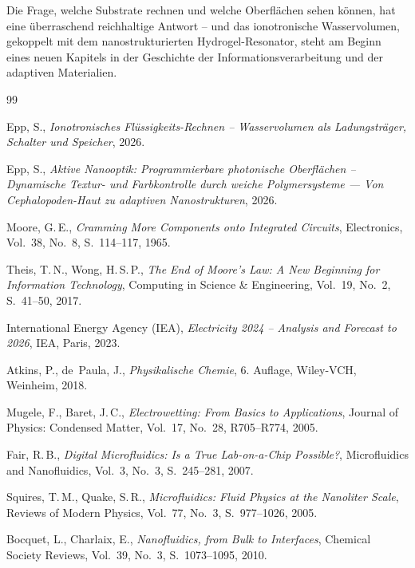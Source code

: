 ﻿\documentclass[a4paper,12pt]{scrreprt}
\theoremstyle{definition}
\begin{document}
Die Frage, welche Substrate rechnen und welche Oberflächen sehen können,
hat eine überraschend reichhaltige Antwort -- und das ionotronische
Wasservolumen, gekoppelt mit dem nanostrukturierten Hydrogel-Resonator,
steht am Beginn eines neuen Kapitels in der Geschichte der Informationsverarbeitung
und der adaptiven Materialien.

\begin{thebibliography}{99}

  Epp, S.,
  \textit{Ionotronisches Flüssigkeits-Rechnen -- Wasservolumen als Ladungsträger, Schalter und Speicher},
  2026.
  
  Epp, S.,
  \textit{Aktive Nanooptik: Programmierbare photonische Oberflächen -- Dynamische Textur- und Farbkontrolle durch weiche Polymersysteme --- Von Cephalopoden-Haut zu adaptiven Nanostrukturen},
  2026.
  
  Moore, G.\,E.,
  \textit{Cramming More Components onto Integrated Circuits},
  Electronics, Vol.~38, No.~8, S.~114--117, 1965.

  Theis, T.\,N., Wong, H.\,S.\,P.,
  \textit{The End of Moore's Law: A New Beginning for Information Technology},
  Computing in Science \& Engineering, Vol.~19, No.~2, S.~41--50, 2017.

  International Energy Agency (IEA),
  \textit{Electricity 2024 -- Analysis and Forecast to 2026},
  IEA, Paris, 2023.

  Atkins, P., de~Paula, J.,
  \textit{Physikalische Chemie},
  6. Auflage, Wiley-VCH, Weinheim, 2018.

  Mugele, F., Baret, J.\,C.,
  \textit{Electrowetting: From Basics to Applications},
  Journal of Physics: Condensed Matter, Vol.~17, No.~28, R705--R774, 2005.

  Fair, R.\,B.,
  \textit{Digital Microfluidics: Is a True Lab-on-a-Chip Possible?},
  Microfluidics and Nanofluidics, Vol.~3, No.~3, S.~245--281, 2007.

  Squires, T.\,M., Quake, S.\,R.,
  \textit{Microfluidics: Fluid Physics at the Nanoliter Scale},
  Reviews of Modern Physics, Vol.~77, No.~3, S.~977--1026, 2005.

  Bocquet, L., Charlaix, E.,
  \textit{Nanofluidics, from Bulk to Interfaces},
  Chemical Society Reviews, Vol.~39, No.~3, S.~1073--1095, 2010.


\end{thebibliography}
\end{document}
